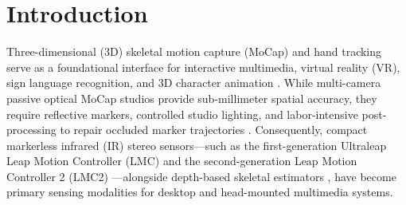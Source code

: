 \documentclass[10pt,twocolumn]{article}
\begin{document}
\begin{abstract}
Level 4 gesture recognition Macro-F1 to $92.64\%$ on SHREC'17-14 ($+9.49\%$ over BlockGCN) and $93.85\%$ on Dual-LMC2, while reducing bone-length consistency error (BLCE) to $2.04\text{--}3.85\text{ mm}$ and biomechanical joint-angle violation rates (JAVR) to $1.08\%$ on Dual-LMC2 and $1.15\%$ on SHREC'17 Level 4 (with mean Joint Angle Error $\text{JAE} = 4.12^\circ$), achieving \textbf{$0.93\text{ ms}$} algorithmic streaming latency ($0.48\text{ ms}$ GPU forward pass, $0\text{ frames}$ lookahead, and $1.42\text{ ms}$ application-level \texttt{.bvh} retargeting latency). Subject-level hypothesis tests confirm statistically significant improvements across each individual benchmark ($p_{\text{Holm}} \le 0.0014$, statistical power $>99\%$).

\vspace{3pt}
\noindent \textbf{Keywords:} 3D Hand Pose Restoration $\cdot$ Optical Motion Capture $\cdot$ Leap Motion Controller 2 $\cdot$ Spatio-Temporal Graph Convolutional Network $\cdot$ $L_2$ Bone Normalization $\cdot$ 3D Character Animation Retargeting
\end{abstract}

\section{Introduction}
Three-dimensional (3D) skeletal motion capture (MoCap) and hand tracking serve as a foundational interface for interactive multimedia, virtual reality (VR), sign language recognition, and 3D character animation \cite{bregler2007motion,tirakoat2011optimized,noiumkar2013use,marin2016hand,rastgoo2025deep}. While multi-camera passive optical MoCap studios provide sub-millimeter spatial accuracy, they require reflective markers, controlled studio lighting, and labor-intensive post-processing to repair occluded marker trajectories \cite{tirakoat2011optimized,noiumkar2013use}. Consequently, compact markerless infrared (IR) stereo sensors---such as the first-generation Ultraleap Leap Motion Controller (LMC) \cite{marin2016hand,boulahia2017dynamic} and the second-generation Leap Motion Controller 2 (LMC2) \cite{gilmartin2024dual,matuszczyk2025comparative}---alongside depth-based skeletal estimators \cite{desmedt2017shrec,kumar2018position}, have become primary sensing modalities for desktop and head-mounted multimedia systems.
\end{document}
